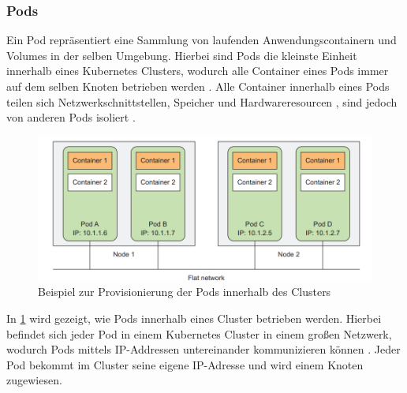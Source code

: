 \subsubsection{Pods}
\label{subsec:kubernetes:pods}
Ein Pod repräsentiert eine Sammlung von laufenden Anwendungscontainern und Volumes in der selben Umgebung.
Hierbei sind Pods die kleinste Einheit innerhalb eines Kubernetes Clusters, wodurch alle Container eines Pods
immer auf dem selben Knoten betrieben werden \cite{Burns2019}.
Alle Container innerhalb eines Pods teilen sich Netzwerkschnittstellen, Speicher und Hardwareresourcen \cite{kubernetesPods},
sind jedoch von anderen Pods isoliert \cite{Burns2019}.

\begin{figure}[h]
  \includegraphics[width=\textwidth]{gfx/chapters/2_grundlagen/kubernetes_network.png}
  \caption{Beispiel zur Provisionierung der Pods innerhalb des Clusters}
  \label{fig:kubernetes_network}
\end{figure}

In \ref{fig:kubernetes_network} wird gezeigt, wie Pods innerhalb eines Cluster betrieben werden.
Hierbei befindet sich jeder Pod in einem Kubernetes Cluster in einem großen Netzwerk, wodurch Pods mittels IP-Addressen untereinander 
kommunizieren können \cite{Marko2018}. Jeder Pod bekommt im Cluster seine eigene IP-Adresse und wird einem Knoten zugewiesen.


